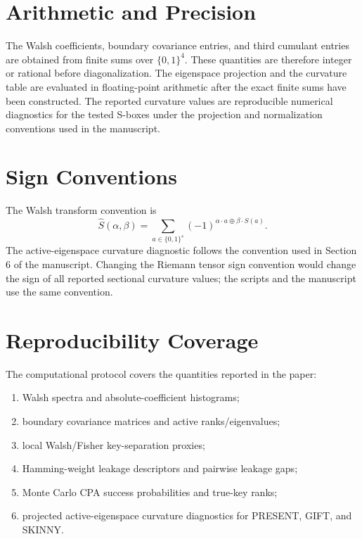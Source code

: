 \documentclass[11pt,a4paper]{article}
\begin{document}
\section{Arithmetic and Precision}

The Walsh coefficients, boundary covariance entries, and third cumulant entries
are obtained from finite sums over $\{0,1\}^4$.  These quantities are therefore
integer or rational before diagonalization.  The eigenspace projection and the
curvature table are evaluated in floating-point arithmetic after the exact
finite sums have been constructed.  The reported curvature values are
reproducible numerical diagnostics for the tested S-boxes under the projection
and normalization conventions used in the manuscript.

\section{Sign Conventions}

The Walsh transform convention is
\[
  \widehat S(\alpha,\beta)=\sum_{a\in\{0,1\}^s}
  (-1)^{\alpha\cdot a\oplus\beta\cdot S(a)}.
\]
The active-eigenspace curvature diagnostic follows the convention used in
Section 6 of the manuscript.  Changing the Riemann tensor sign convention would
change the sign of all reported sectional curvature values; the scripts and
the manuscript use the same convention.

\section{Reproducibility Coverage}

The computational protocol covers the quantities reported in the paper:
\begin{enumerate}[label=\normalfont(\roman*)]
  \item Walsh spectra and absolute-coefficient histograms;
  \item boundary covariance matrices and active ranks/eigenvalues;
  \item local Walsh/Fisher key-separation proxies;
  \item Hamming-weight leakage descriptors and pairwise leakage gaps;
  \item Monte Carlo CPA success probabilities and true-key ranks;
  \item projected active-eigenspace curvature diagnostics for PRESENT, GIFT,
  and SKINNY.
\end{enumerate}
\end{document}
